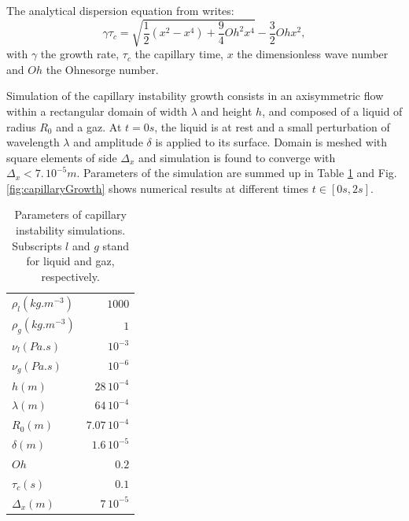\documentclass[onecolumn, 12pt]{asme2ej}
\begin{document}
The analytical dispersion equation from \cite{chandrasekhar2013hydrodynamic} writes:
\begin{equation}
    \gamma \tau_c = \sqrt{\frac{1}{2}(x^{2}-x^{4}) + \frac{9}{4}Oh^{2}x^{4}}-\frac{3}{2}Oh x^{2},
    \label{eq:growthRateAnalytical}
\end{equation}
with $\gamma$ the growth rate, $\displaystyle \tau_c $ the capillary time, $x$ the dimensionless wave number and $Oh$ the Ohnesorge number.


Simulation of the capillary instability growth consists in an axisymmetric flow within a rectangular domain of width $\lambda$ and height $h$, and composed of a liquid of radius $R_0$ and a gaz. At $t = 0s$, the liquid is at rest and a small perturbation of wavelength $\lambda$ and amplitude $\delta$ is applied to its surface. 
Domain is meshed with square elements of side $\Delta_x$ and simulation is found to converge with $\Delta_x< 7.\,10^{-5}m$. Parameters of the simulation are summed up in Table \ref{tab:parametersPinch} and Fig.\ref{fig:capillaryGrowth} shows numerical results at different times $t \in [0s,2s]$.

\begin{table}
    \begin{center}
        \begin{tabular}{lr}
            \hline
            $\rho_{l} (kg.m^{-3})$ & $1000$\\
            $\rho_{g} (kg.m^{-3})$ & $1$\\
            $\nu_{l} (Pa.s)$ & $10^{-3}$\\
            $\nu_{g} (Pa.s)$ & $10^{-6}$\\
            $h(m)$ & $28\, 10^{-4}$\\
            $\lambda (m)$ & $64\, 10^{-4}$\\
            $R_0(m)$ & $7.07\, 10^{-4}$\\
            $\delta (m)$ & $1.6\, 10^{-5}$\\
            $Oh$ & $0.2$\\
            $\tau_{c}(s)$ & $0.1$  \\   
            $\Delta_x(m)$ & $7\,10^{-5}$ \\      
            \hline
        \end{tabular}
    \end{center}
    
    \caption{\label{tab:parametersPinch}Parameters of capillary instability simulations. Subscripts $l$ and $g$ stand for liquid and gaz, respectively.}
\end{table}
\end{document}
